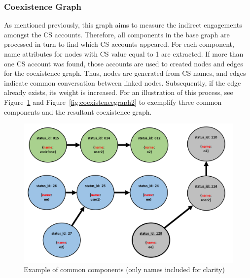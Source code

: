 \documentclass[sigconf]{acmart}
\begin{document}
{\subsubsection{Coexistence Graph}

As mentioned previously, this graph aims to measure the indirect
engagements amongst the CS accounts. Therefore, all components in the
base graph are processed in turn to find which CS accounts
appeared. For each component, name attributes for nodes with CS value
equal to 1 are extracted.  If more than one CS account was found,
those accounts are used to created nodes and edges for the coexistence
graph. Thus, nodes are generated from CS names, and edges indicate
common conversation between linked nodes. Subsequently, if the edge 
already exists, its weight is increased.  For an illustration of this
process, see Figure~\ref{fig:ccmethod} and
Figure~\ref{fig:coexistencegraph2} 
to exemplify three common components and the resultant
coexistence graph.

\begin{figure}[htb]
\centering
\includegraphics[width=\columnwidth]{images/ccmethod.png}
\caption{Example of common components (only names included for clarity)}
\label{fig:ccmethod}
\end{figure}

}
\end{document}
